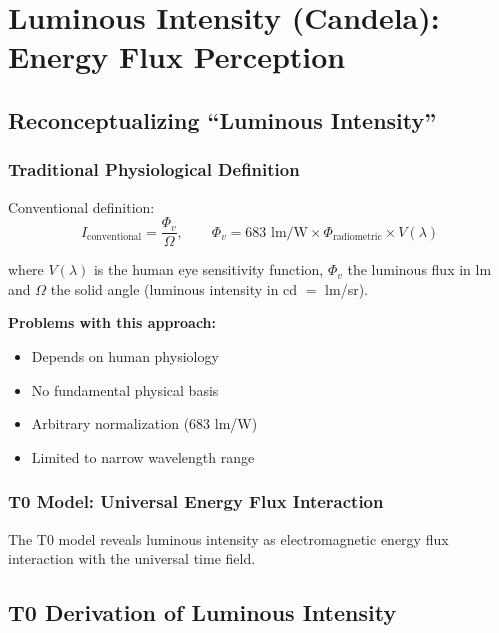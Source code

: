 	\section{Luminous Intensity (Candela): Energy Flux Perception}
	\label{sec:candela_derivation}
	
	\subsection{Reconceptualizing ``Luminous Intensity''}
	\label{subsec:reconceptualizing_luminosity}
	
	\subsubsection{Traditional Physiological Definition}
	\label{subsubsec:traditional_luminosity}
	
	Conventional definition:
	\begin{equation}
		I_{\text{conventional}} = \frac{\Phi_v}{\Omega}, \qquad \Phi_v = 683 \text{ lm/W} \times \Phi_{\text{radiometric}} \times V(\lambda)
		\label{eq:conventional_candela}
	\end{equation}
	
	where $V(\lambda)$ is the human eye sensitivity function, $\Phi_v$ the luminous flux in lm and $\Omega$ the solid angle (luminous intensity in cd $=$ lm/sr).
	
	\textbf{Problems with this approach:}
	\begin{itemize}
		\item Depends on human physiology
		\item No fundamental physical basis
		\item Arbitrary normalization (683 lm/W)
		\item Limited to narrow wavelength range
	\end{itemize}
	
	\subsubsection{T0 Model: Universal Energy Flux Interaction}
	\label{subsubsec:t0_universal_flux}
	
	The T0 model reveals luminous intensity as electromagnetic energy flux interaction with the universal time field.
	
	\subsection{T0 Derivation of Luminous Intensity}
	\label{subsec:t0_candela_derivation}
	
